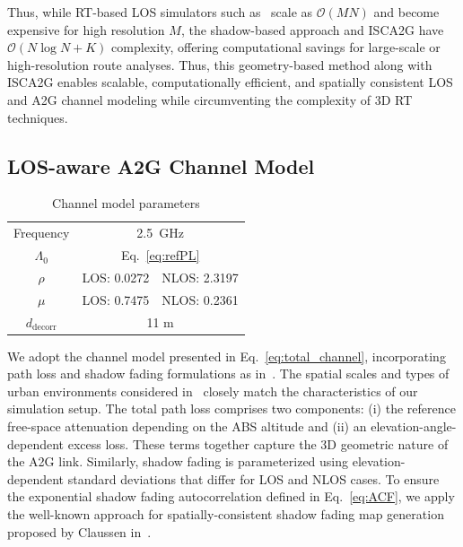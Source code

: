 \documentclass[10pt,conference]{IEEEtran}
\begin{document}
Thus, while RT-based LOS simulators such as~\cite{Saboor2023simulator} scale as $\mathcal{O}(MN)$ and become expensive for high resolution $M$, the shadow-based approach and ISCA2G have $\mathcal{O}(N\log N+K)$ complexity, offering computational savings for large-scale or high-resolution route analyses. Thus, this geometry-based method along with ISCA2G enables scalable, computationally efficient, and spatially consistent LOS and A2G channel modeling while circumventing the complexity of 3D RT techniques.

\subsection{LOS-aware A2G Channel Model}

\begin{table}[!t]
	\caption{Channel model parameters}\label{tab:channel}
	\begin{center}
		\begin{tabular}
			{c|c|c}
			Frequency & \multicolumn{2}{c}{2.5~GHz}\\
			$\Lambda_0$ & \multicolumn{2}{c}{Eq.~\eqref{eq:refPL}}\\
			$\rho$ & {LOS: 0.0272}& {NLOS: 2.3197}\\
			$\mu$ & {LOS: 0.7475}& {NLOS: 0.2361}\\
			$d_{\text{decorr}}$ & \multicolumn{2}{c}{11 m}\\


		\end{tabular}
	\end{center}
\end{table}
We adopt the channel model presented in Eq.~\eqref{eq:total_channel}, incorporating path loss and shadow fading formulations as in~\cite{Feng2006a2gPL}. {The spatial scales and types of urban environments considered in~\cite{Feng2006a2gPL} closely match the characteristics of our simulation setup.} The total path loss comprises two components: (i) the reference free-space attenuation depending on the ABS altitude and (ii) an elevation-angle-dependent excess loss. These terms together capture the 3D geometric nature of the A2G link. Similarly, shadow fading is parameterized using elevation-dependent standard deviations that differ for LOS and NLOS cases. To ensure the exponential shadow fading autocorrelation defined in Eq.~\eqref{eq:ACF}, we apply the well-known approach for spatially-consistent shadow fading map generation proposed by Claussen in~\cite{Claussen2005SFmap}.
\end{document}
